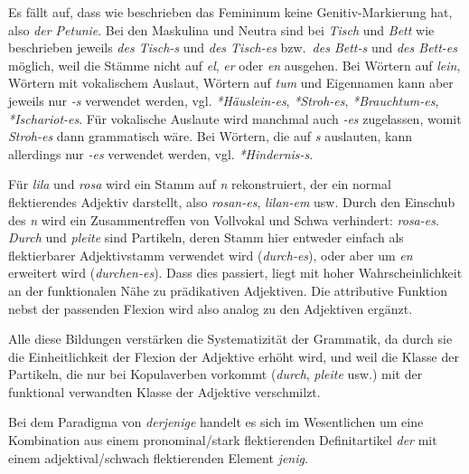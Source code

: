 \label{sol:nominalflexion04}

Es fällt auf, dass wie beschrieben das Femininum keine Genitiv-Markierung hat, also \textit{der Petunie}.
Bei den Maskulina und Neutra sind bei \textit{Tisch} und \textit{Bett} wie beschrieben jeweils \textit{des Tisch-s} und \textit{des Tisch-es} bzw.\ \textit{des Bett-s} und \textit{des Bett-es} möglich, weil die Stämme nicht auf \textit{el}, \textit{er} oder \textit{en} ausgehen.
Bei Wörtern auf \textit{lein}, Wörtern mit vokalischem Auslaut, Wörtern auf \textit{tum} und Eigennamen kann aber jeweils nur \textit{-s} verwendet werden, vgl. \textit{*Häuslein-es}, \textit{*Stroh-es}, \textit{*Brauchtum-es}, \textit{*Ischariot-es}.
Für vokalische Auslaute wird manchmal auch \textit{-es} zugelassen, womit \textit{Stroh-es} dann grammatisch wäre.
Bei Wörtern, die auf \textit{s} auslauten, kann allerdings nur \textit{-es} verwendet werden, vgl. \textit{*Hindernis-s}.

\label{sol:nominalflexion05}

Für \textit{lila} und \textit{rosa} wird ein Stamm auf \textit{n} rekonstruiert, der ein normal flektierendes Adjektiv darstellt, also \textit{rosan-es}, \textit{lilan-em} usw.
Durch den Einschub des \textit{n} wird ein Zusammentreffen von Vollvokal und Schwa verhindert: \textit{\Ast rosa-es}.\\
\textit{Durch} und \textit{pleite} sind Partikeln, deren Stamm hier entweder einfach als flektierbarer Adjektivstamm verwendet wird (\textit{durch-es}), oder aber um \textit{en} erweitert wird (\textit{durchen-es}).
Dass dies passiert, liegt mit hoher Wahrscheinlichkeit an der funktionalen Nähe zu prädikativen Adjektiven.
Die attributive Funktion nebst der passenden Flexion wird also analog zu den Adjektiven ergänzt.

Alle diese Bildungen verstärken die Systematizität der Grammatik, da durch sie die Einheitlichkeit der Flexion der Adjektive erhöht wird, und weil die Klasse der Partikeln, die nur bei Kopulaverben vorkommt (\textit{durch}, \textit{pleite} usw.) mit der funktional verwandten Klasse der Adjektive verschmilzt.

\label{sol:nominalflexion06}

Bei dem Paradigma von \textit{derjenige} handelt es sich im Wesentlichen um eine Kombination aus einem pronominal\slash stark flektierenden Definitartikel \textit{der} mit einem adjektival\slash schwach flektierenden Element \textit{jenig}.

